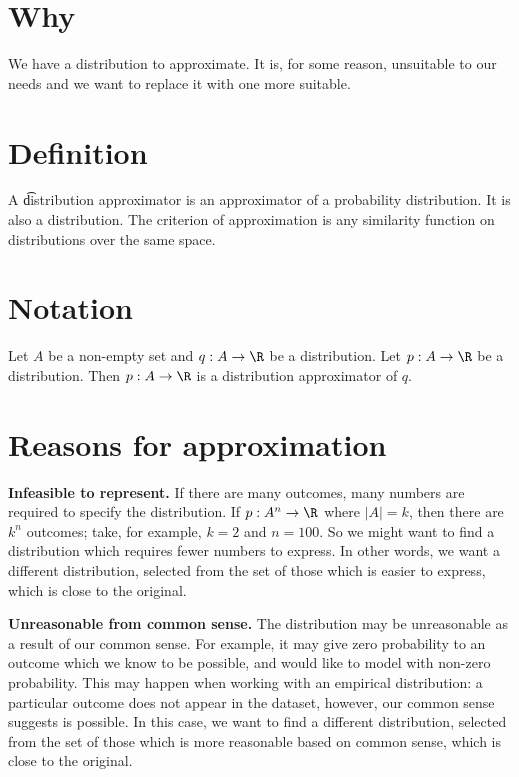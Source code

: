 
\section*{Why}

We have a distribution to approximate.
It is, for some reason, unsuitable to our needs and we want to replace it with one more suitable.

\section*{Definition}

A \t{distribution approximator} is an approximator of a probability distribution.
It is also a distribution.
The criterion of approximation is any similarity function on distributions over the same space.

\section*{Notation}

Let $A$ be a non-empty set and $q: A \to \R $ be a distribution.
Let $p: A \to \R $ be a distribution.
Then $p: A \to \R $ is a distribution approximator of $q$.

\section*{Reasons for approximation}


\textbf{Infeasible to represent.}
If there are many outcomes, many numbers are required to specify the distribution.
If $p: A^n \to \R $ where $\mid A\mid  = k$, then there are $k^n$ outcomes; take, for example, $k = 2$ and $n = 100$.
So we might want to find a distribution which requires fewer numbers to express.
In other words, we want a different distribution, selected from the set of those which is easier to express, which is close to the original.

\textbf{Unreasonable from common sense.}
The distribution may be unreasonable as a result of our common sense.
For example, it may give zero probability to an outcome which we know to be possible, and would like to model with non-zero probability.
This may happen when working with an empirical distribution: a particular outcome does not appear in the dataset, however, our common sense suggests is possible.
In this case, we want to find a different distribution, selected from the set of those which is more reasonable based on common sense, which is close to the original.
